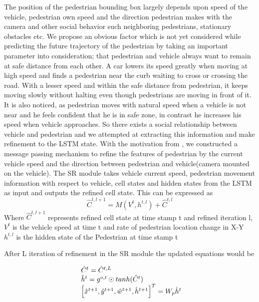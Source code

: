 The position of the pedestrian bounding box largely depends upon speed of the vehicle, pedestrian own speed and the direction pedestrian makes with the camera and other social behavior such neighboring pedestrians, stationary obstacles etc. We propose an obvious factor which is not yet considered while predicting the future trajectory of the pedestrian by taking an important parameter into consideration; that pedestrian and vehicle always want to remain at safe distance from each other. A car lowers its speed greatly when moving at high speed and finds a pedestrian near the curb waiting to cross or crossing the road. With a lesser speed and within the safe distance from pedestrian, it keeps moving slowly without halting even though pedestrians are moving in front of it.
It is also noticed, as pedestrian moves with natural speed when a vehicle is not near and he feels confident that he is in safe zone, in contrast he increases his speed when vehicle approaches. So there exists a social relationship between vehicle and pedestrian and we attempted at extracting this information and make refinement to the LSTM state. With the motivation from \cite{zhang2019sr}, we constructed a message passing mechanism to refine the features of pedestrian by the current vehicle speed and the direction between pedestrian and vehicle(camera mounted on the vehicle). The SR module takes vehicle current speed, pedestrian movement information with respect to vehicle, cell states and hidden states from the LSTM as input and outputs the refined cell state. This can be expressed as 
\begin{equation}
\hat{C}^{t, l+1}= M(V^t, {h}^{t, l}) + \hat{C}^{t, l}
\end{equation}
Where $\hat{C}^{t, l+1}$ represents refined cell state at time stamp t and refined iteration l, $V^t$ is the vehicle speed at time t and rate of pedestrian location change in X-Y \\
${h}^{t, l}$ is the hidden state of the Pedestrian at time stamp t

After L iteration of refinement in the SR module the updated equations would be

\begin{equation}
\begin{array}{l@{}}
\hat{C}^{t}=\hat{C}^{t, L} \\
\hat{h}^{t}={g}^{o,t} \odot tanh(\hat{C}^{t}) \\
\left[ \hat{x}^{t+1}, \hat{y}^{t+1}, \hat{w}^{t+1}, \hat{h}^{t+1} \right] ^ T = W_p\hat{h}^{t}
\end{array}
\end{equation}

